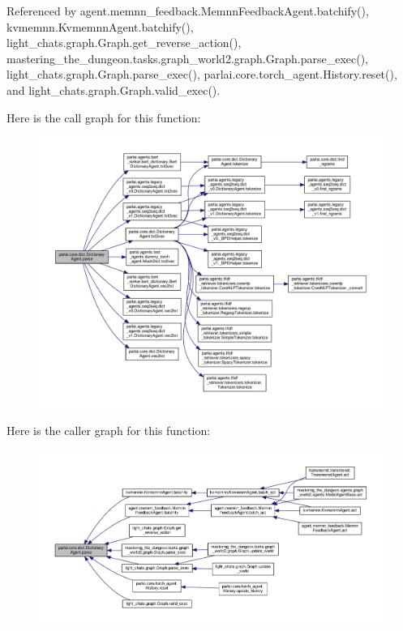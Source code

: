 Referenced by agent.\+memnn\+\_\+feedback.\+Memnn\+Feedback\+Agent.\+batchify(), kvmemnn.\+Kvmemnn\+Agent.\+batchify(), light\+\_\+chats.\+graph.\+Graph.\+get\+\_\+reverse\+\_\+action(), mastering\+\_\+the\+\_\+dungeon.\+tasks.\+graph\+\_\+world2.\+graph.\+Graph.\+parse\+\_\+exec(), light\+\_\+chats.\+graph.\+Graph.\+parse\+\_\+exec(), parlai.\+core.\+torch\+\_\+agent.\+History.\+reset(), and light\+\_\+chats.\+graph.\+Graph.\+valid\+\_\+exec().

Here is the call graph for this function\+:
\nopagebreak
\begin{figure}[H]
\begin{center}
\leavevmode
\includegraphics[width=350pt]{classparlai_1_1core_1_1dict_1_1DictionaryAgent_ad34c4135329f6768d22d519c3c483d68_cgraph}
\end{center}
\end{figure}
Here is the caller graph for this function\+:
\nopagebreak
\begin{figure}[H]
\begin{center}
\leavevmode
\includegraphics[width=350pt]{classparlai_1_1core_1_1dict_1_1DictionaryAgent_ad34c4135329f6768d22d519c3c483d68_icgraph}
\end{center}
\end{figure}
\mbox{\label{classparlai_1_1core_1_1dict_1_1DictionaryAgent_a78edf54954bf0514e1798ce694a758fe}} 
